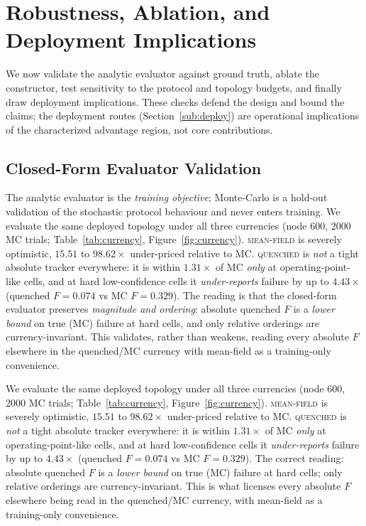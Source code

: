\documentclass[journal]{IEEEtran}
\newcommand{\qq}{\textsc{quenched}}
\newcommand{\mf}{\textsc{mean-field}}
\begin{document}
\section{Robustness, Ablation, and Deployment Implications}\label{sec:robust}

We now validate the analytic evaluator against ground truth, ablate the
constructor, test sensitivity to the protocol and topology budgets, and finally
draw deployment implications. These checks defend the design and bound the
claims; the deployment routes (Section~\ref{sub:deploy}) are operational
implications of the characterized advantage region, not core contributions.

\subsection{Closed-Form Evaluator Validation}\label{sub:currencyval}

The analytic evaluator is the \emph{training objective}; Monte-Carlo is a
hold-out validation of the stochastic protocol behaviour and never enters
training. We evaluate the same deployed topology under all three currencies (node
600, 2000 MC trials; Table~\ref{tab:currency}, Figure~\ref{fig:currency}). \mf{}
is severely optimistic, $15.51$ to $98.62\times$ under-priced relative to MC.
\qq{} is \emph{not} a tight absolute tracker everywhere: it is within
$1.31\times$ of MC \emph{only} at operating-point-like cells, and at hard
low-confidence cells it \emph{under-reports} failure by up to $4.43\times$
(quenched $F{=}0.074$ vs MC $F{=}0.329$). The reading is that the closed-form
evaluator preserves \emph{magnitude and ordering}: absolute quenched $F$ is a
\emph{lower bound} on true (MC) failure at hard cells, and only relative orderings
are currency-invariant. This validates, rather than weakens, reading every
absolute $F$ elsewhere in the quenched/MC currency with mean-field as a
training-only convenience.

We evaluate the same deployed topology under all three currencies (node 600,
2000 MC trials; Table~\ref{tab:currency}, Figure~\ref{fig:currency}). \mf{} is
severely optimistic, $15.51$ to $98.62\times$ under-priced relative to MC. \qq{}
is \emph{not} a tight absolute tracker everywhere: it is within $1.31\times$ of
MC \emph{only} at operating-point-like cells, and at hard low-confidence cells
it \emph{under-reports} failure by up to $4.43\times$ (quenched $F{=}0.074$ vs
MC $F{=}0.329$). The correct reading: absolute quenched $F$ is a \emph{lower
bound} on true (MC) failure at hard cells; only relative orderings are
currency-invariant. This is what licenses every absolute $F$ elsewhere being read
in the quenched/MC currency, with mean-field as a training-only convenience.
\end{document}
